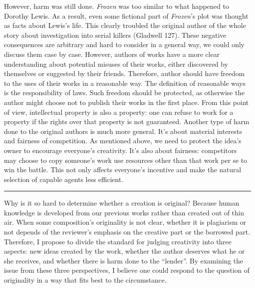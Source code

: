 \documentclass{writing}
\begin{document}
However, harm was still done. \emph{Frozen} was too similar to what
happened to Dorothy Lewis. As a result, even some fictional part of
\emph{Frozen}'s plot was thought as facts about Lewis's life. This
clearly troubled the original author of the whole story about
investigation into serial killers (Gladwell 127). These negative
consequences are arbitrary and hard to consider in a general way, we
could only discuss them case by case. However, authors of works have a
more clear understanding about potential misuses of their works, either
discovered by themselves or suggested by their friends. Therefore,
author should have freedom to the uses of their works in a reasonable
way. The definition of reasonable ways is the responsibility of laws.
Such freedom should be protected, as otherwise the author might choose
not to publish their works in the first place. From this point of view,
intellectual property is also a property: one can refuse to work for a
property if the rights over that property is not guaranteed. Another
type of harm done to the original authors is much more general. It's
about material interests and fairness of competition. As mentioned
above, we need to protect the idea's owner to encourage everyone's
creativity. It's also about fairness: competitors may choose to copy
someone's work use resources other than that work per se to win the
battle. This not only affects everyone's incentive and make the natural
selection of capable agents less efficient.

\begin{center}\rule{0.5\linewidth}{\linethickness}\end{center}

Why is it so hard to determine whether a creation is original? Because
human knowledge is developed from our previous works rather than created
out of thin air. When some composition's originality is not clear,
whether it is plagiarism or not depends of the reviewer's emphasis on
the creative part or the borrowed part. Therefore, I propose to divide
the standard for judging creativity into three aspects: new ideas
created by the work, whether the author deserves what he or she
receives, and whether there is harm done to the ``lender''. By examining
the issue from these three perspectives, I believe one could respond to
the question of originality in a way that fits best to the circumstance.
\end{document}
